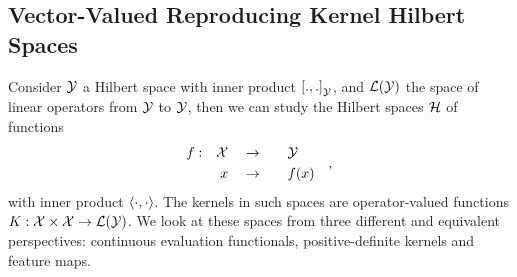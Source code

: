 \subsection{Vector-Valued Reproducing Kernel Hilbert Spaces}%
Consider $\mathcal{Y}$ a Hilbert space with inner product $\left[ ., . \right]_\mathcal{Y}$, and $\mathcal{L}(\mathcal{Y})$ the space of linear operators from $\mathcal{Y}$ to $\mathcal{Y}$, then we can study the Hilbert spaces $\mathcal{H}$ of functions
\begin{equation*}
    \begin{aligned}
        f: &&\mathcal{X}&& &\to& &&&\mathcal{Y}&& \\
             && x&&      &\to& &&& f(x) &&
    \end{aligned},
\end{equation*}
with inner product $\left\langle \cdot, \cdot \right\rangle$.
The kernels in such spaces are operator-valued functions $K: \mathcal{X} \times \mathcal{X} \to \mathcal{L}(\mathcal{Y})$.
We look at these spaces from three different and equivalent perspectives: continuous evaluation functionals, positive-definite kernels and feature maps.

